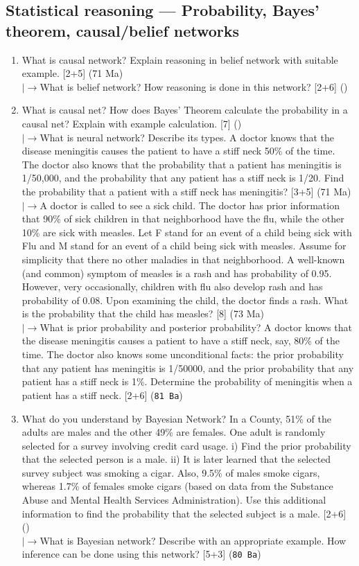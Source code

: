 \documentclass[12pt]{article}
\newcommand{\lb}{\\$\left|\rightarrow\right.$}
\begin{document}
  \subsection{Statistical reasoning --- Probability, Bayes' theorem, causal/belief networks}
    \begin{enumerate}[topsep=0pt, noitemsep]
      \item What is causal network? Explain reasoning in belief network with suitable example. \hfill [2+5] (71 Ma)
        \lb What is belief network? How reasoning is done in this network? \hfill [2+6] ()

      \item What is causal net? How does Bayes' Theorem calculate the probability in a causal net? Explain with example calculation. \hfill [7] ()
        \lb What is neural network? Describe its types. A doctor knows that the disease meningitis causes the patient to have a stiff neck 50\% of the time. The doctor also knows that the probability that a patient has meningitis is 1/50,000, and the probability that any patient has a stiff neck is 1/20. Find the probability that a patient with a stiff neck has meningitis? \hfill [3+5] (71 Ma)
        \lb A doctor is called to see a sick child. The doctor has prior information that 90\% of sick children in that neighborhood have the flu, while the other 10\% are sick with measles. Let F stand for an event of a child being sick with Flu and M stand for an event of a child being sick with measles. Assume for simplicity that there no other maladies in that neighborhood. A well-known (and common) symptom of measles is a rash and has probability of 0.95. However, very occasionally, children with flu also develop rash and has probability of 0.08. Upon examining the child, the doctor finds a rash. What is the probability that the child has measles? \hfill [8] (73 Ma)
        \lb What is prior probability and posterior probability? A doctor knows that the disease meningitis causes a patient to have a stiff neck, say, 80\% of the time. The doctor also knows some unconditional facts: the prior probability that any patient has meningitis is 1/50000, and the prior probability that any patient has a stiff neck is 1\%. Determine the probability of meningitis when a patient has a stiff neck. \hfill [2+6] (\texttt{81 Ba})

      \item What do you understand by Bayesian Network? In a County, 51\% of the adults are males and the other 49\% are females. One adult is randomly selected for a survey involving credit card usage. i) Find the prior probability that the selected person is a male. ii) It is later learned that the selected survey subject was smoking a cigar. Also, 9.5\% of males smoke cigars, whereas 1.7\% of females smoke cigars (based on data from the Substance Abuse and Mental Health Services Administration). Use this additional information to find the probability that the selected subject is a male. \hfill [2+6] ()
        \lb What is Bayesian network? Describe with an appropriate example. How inference can be done using this network? \hfill [5+3] (\texttt{80 Ba})
    \end{enumerate}
\end{document}
